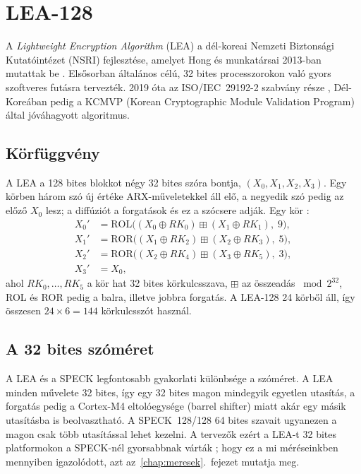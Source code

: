 \documentclass[a4paper,12pt]{report}
\theoremstyle{definition}
\theoremstyle{remark}
\begin{document}
\section{LEA-128}\label{sec:lea}

A \emph{Lightweight Encryption Algorithm} (LEA) a dél-koreai Nemzeti Biztonsági Kutatóintézet (NSRI) fejlesztése, amelyet Hong és munkatársai 2013-ban mutattak be \cite{Hong2013}. Elsősorban általános célú, 32 bites processzorokon való gyors szoftveres futásra tervezték. 2019 óta az ISO/IEC~29192-2 szabvány része \cite{ISO29192}, Dél-Koreában pedig a KCMVP (Korean Cryptographic Module Validation Program) által jóváhagyott algoritmus.

\subsection{Körfüggvény}\label{sec:lea_kor}

A LEA a 128 bites blokkot négy 32 bites szóra bontja, $(X_0, X_1, X_2, X_3)$. Egy körben három szó új értéke ARX-műveletekkel áll elő, a negyedik szó pedig az előző $X_0$ lesz; a diffúziót a forgatások és ez a szócsere adják. Egy kör \cite{Hong2013}:
\begin{align}
X_0' &= \text{ROL}\big((X_0 \oplus RK_0) \mathbin{\boxplus} (X_1 \oplus RK_1),\; 9\big), \\
X_1' &= \text{ROR}\big((X_1 \oplus RK_2) \mathbin{\boxplus} (X_2 \oplus RK_3),\; 5\big), \\
X_2' &= \text{ROR}\big((X_2 \oplus RK_4) \mathbin{\boxplus} (X_3 \oplus RK_5),\; 3\big), \\
X_3' &= X_0,
\end{align}
ahol $RK_0, \ldots, RK_5$ a kör hat 32 bites körkulcsszava, $\boxplus$ az összeadás $\bmod 2^{32}$, ROL és ROR pedig a balra, illetve jobbra forgatás. A LEA-128 24 körből áll, így összesen $24 \times 6 = 144$ körkulcsszót használ.

\subsection{A 32 bites szóméret}

A LEA és a SPECK legfontosabb gyakorlati különbsége a szóméret. A LEA minden művelete 32 bites, így egy 32 bites magon mindegyik egyetlen utasítás, a forgatás pedig a Cortex-M4 eltolóegysége (barrel shifter) miatt akár egy másik utasításba is beolvasztható. A SPECK~128/128 64 bites szavait ugyanezen a magon csak több utasítással lehet kezelni. A tervezők ezért a LEA-t 32 bites platformokon a SPECK-nél gyorsabbnak várták \cite{Hong2013}; hogy ez a mi méréseinkben mennyiben igazolódott, azt az~\ref{chap:meresek}.~fejezet mutatja meg.
\end{document}

